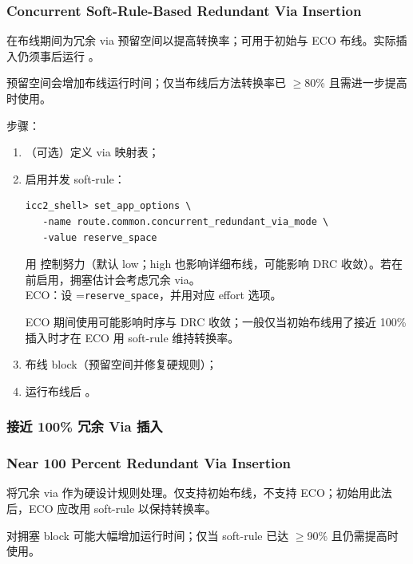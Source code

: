 \subsubsection*{Concurrent Soft-Rule-Based Redundant Via Insertion}

在布线期间为冗余 via 预留空间以提高转换率；可用于初始与 ECO 布线。实际插入仍须事后运行 。

\begin{noteBox}
预留空间会增加布线运行时间；仅当布线后方法转换率已 $\ge$80\% 且需进一步提高时使用。
\end{noteBox}

步骤：
\begin{enumerate}
  \item （可选）定义 via 映射表；
  \item 启用并发 soft-rule：
\begin{lstlisting}
icc2_shell> set_app_options \
   -name route.common.concurrent_redundant_via_mode \
   -value reserve_space
\end{lstlisting}
        用  控制努力（默认 low；high 也影响详细布线，可能影响 DRC 收敛）。若在  前启用，拥塞估计会考虑冗余 via。\\
        ECO：设 =\texttt{reserve\_space}，并用对应 effort 选项。
\begin{noteBox}
ECO 期间使用可能影响时序与 DRC 收敛；一般仅当初始布线用了接近 100\% 插入时才在 ECO 用 soft-rule 维持转换率。
\end{noteBox}
  \item 布线 block（预留空间并修复硬规则）；
  \item 运行布线后 。
\end{enumerate}

\subsubsection{接近 100\% 冗余 Via 插入}
\subsubsection*{Near 100 Percent Redundant Via Insertion}

将冗余 via 作为硬设计规则处理。仅支持初始布线，不支持 ECO；初始用此法后，ECO 应改用 soft-rule 以保持转换率。

\begin{noteBox}
对拥塞 block 可能大幅增加运行时间；仅当 soft-rule 已达 $\ge$90\% 且仍需提高时使用。
\end{noteBox}

